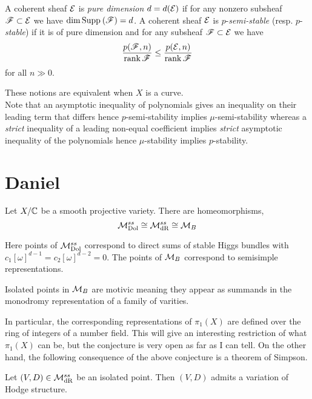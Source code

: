 \documentclass[12pt]{article}
\begin{document}
\begin{defn}
A coherent sheaf $\mathcal{E}$ is \textit{pure dimension} $d = d(\mathcal{E})$ if for any nonzero subsheaf $\mathscr{F} \subset \mathcal{E}$ we have $\dim{\mathrm{Supp}_{}\left(\mathscr{F}\right)} = d$. A coherent sheaf $\mathcal{E}$ is $p$-\textit{semi-stable} (resp. $p$-\textit{stable}) if it is of pure dimension and for any subsheaf $\mathscr{F} \subset \mathcal{E}$ we have
\[ \frac{p(\mathscr{F}, n)}{\operatorname{\mathrm{rank}}{\mathscr{F}}} \le \frac{p(\mathcal{E}, n)}{\operatorname{\mathrm{rank}}{\mathscr{F}}} \]
for all $n \gg 0$.  
\end{defn}

These notions are equivalent when $X$ is a curve.
\bigskip\\
Note that an asymptotic inequality of polynomials gives an inequality on their leading term that differs hence $p$-semi-stability implies $\mu$-semi-stability whereas a \textit{strict} inequality of a leading non-equal coefficient implies \textit{strict} asymptotic inequality of the polynomials hence $\mu$-stability implies $p$-stability. 

\section{Daniel}

\newcommand{\prim}{\mathrm{prim}}

\begin{theorem}
Let $X/\mathbb{C}$ be a smooth projective variety. There are homeomorphisms,
\[ \mathcal{M}^{ss}_{\mathrm{Dol}} \cong \mathcal{M}^{ss}_{\mathrm{dR}} \cong \mathcal{M}_B \]
\end{theorem}

Here points of $\mathcal{M}^{ss}_{\mathrm{Dol}}$ correspond to direct sums of stable Higgs bundles with $c_1 [\omega]^{d-1} = c_2 [\omega]^{d-2} = 0$. The points of $\mathcal{M}_B$ correspond to semisimple representations.

\begin{conj}
Isolated points in $\mathcal{M}_B$ are motivic meaning they appear as summands in the monodromy representation of a family of varities.
\end{conj}

In particular, the corresponding representations of $\pi_1(X)$ are defined over the ring of integers of a number field. This will give an interesting restriction of what $\pi_1(X)$ can be, but the conjecture is very open as far as I can tell. On the other hand, the following consequence of the above conjecture is a theorem of Simpson.

\begin{theorem}[Simpson]
Let $(V, D) \in \mathcal{M}^{ss}_{\mathrm{dR}}$ be an isolated point. Then $(V, D)$ admits a variation of Hodge structure.
\end{theorem}
\end{document}
